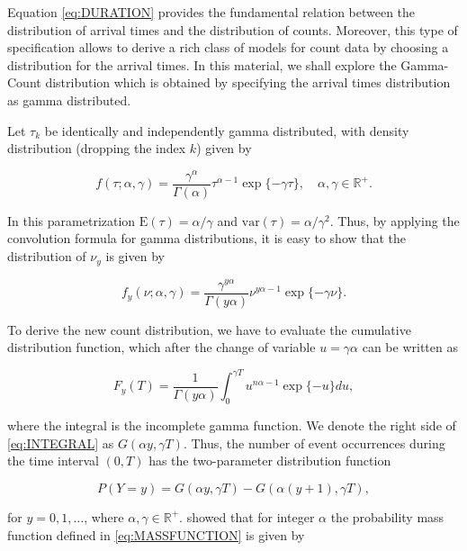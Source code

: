 \documentclass[9pt,a5paper,]{book}
\theoremstyle{definition}
\theoremstyle{definition}
\theoremstyle{remark}
\begin{document}
Equation \eqref{eq:DURATION} provides the fundamental relation between the
distribution of arrival times and the distribution of counts. Moreover,
this type of specification allows to derive a rich class of models for
count data by choosing a distribution for the arrival times. In this
material, we shall explore the Gamma-Count distribution which is
obtained by specifying the arrival times distribution as gamma
distributed.

Let \(\tau_k\) be identically and independently gamma distributed, with
density distribution (dropping the index \(k\)) given by

\begin{equation}
f(\tau; \alpha, \gamma) = \frac{\gamma^{\alpha}}{\Gamma(\alpha)} \tau^{\alpha-1} \exp\{-\gamma \tau\}, \quad \alpha, \gamma \in \mathbb{R}^{+}.
\end{equation}

In this parametrization \(\mathrm{E}(\tau) = \alpha/\gamma\) and
\(\mathrm{var}(\tau) = \alpha/\gamma^2\). Thus, by applying the
convolution formula for gamma distributions, it is easy to show that the
distribution of \(\nu_y\) is given by

\begin{equation}
f_y(\nu; \alpha, \gamma) = \frac{\gamma^{y\alpha}}{\Gamma(y\alpha)} \nu^{y\alpha-1} \exp\{-\gamma \nu\}.
\end{equation}

To derive the new count distribution, we have to evaluate the cumulative
distribution function, which after the change of variable
\(u = \gamma \alpha\) can be written as

\begin{equation}
F_y(T) = \frac{1}{\Gamma(y\alpha)} \int_0^{\gamma T} u^{n\alpha -1} \exp\{-u\} du,
\label{eq:INTEGRAL}
\end{equation}

where the integral is the incomplete gamma function. We denote the right
side of \eqref{eq:INTEGRAL} as \(G(\alpha y, \gamma T)\). Thus, the number
of event occurrences during the time interval \((0,T)\) has the
two-parameter distribution function

\begin{equation}
P(Y = y) = G(\alpha y, \gamma T) - G(\alpha (y + 1), \gamma T),
\label{eq:MASSFUNCTION}
\end{equation}

for \(y = 0, 1, \ldots\), where \(\alpha, \gamma \in \mathbb{R}^+\).
\citet{Winkelman1995} showed that for integer \(\alpha\) the probability
mass function defined in \eqref{eq:MASSFUNCTION} is given by
\end{document}
